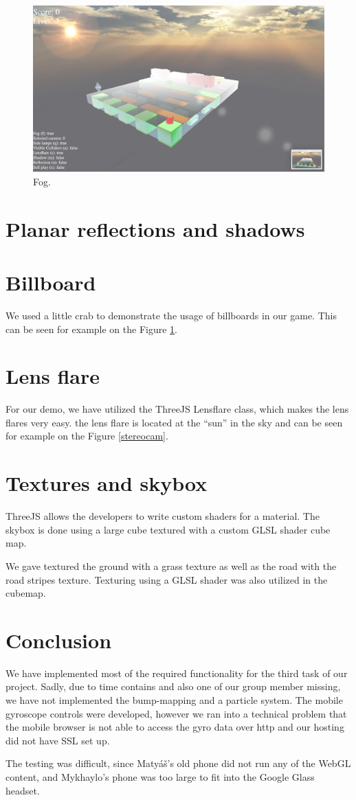 \documentclass[a4paper,10pt]{article}
\begin{document}
\begin{figure}[!htb]
	\centering
 	\includegraphics[width=0.5\linewidth]{images/fog.png}
  	\caption{Fog.}
	\label{fog}
\end{figure}


\section{Planar reflections and shadows}

\section{Billboard}
We used a little crab to demonstrate the usage of billboards in our game. This can be seen for example on the Figure \ref{fog}.

\section{Lens flare}
For our demo, we have utilized the ThreeJS Lensflare class, which makes the lens flares very easy. the lens flare is located at the ``sun'' in the sky and can be seen for example on the Figure \ref{stereocam}.

\section{Textures and skybox}
ThreeJS allows the developers to write custom shaders for a material. The skybox is done using a large cube textured with a custom GLSL shader cube map. 

We gave textured the ground with a grass texture as well as the road with the road stripes texture. Texturing using a GLSL shader was also utilized in the cubemap.

\section*{Conclusion}
We have implemented most of the required functionality for the third task of our project. Sadly, due to time contains and also one of our group member missing, we have not implemented the bump-mapping and a particle system. The mobile gyroscope controls were developed, however we ran into a technical problem that the mobile browser is not able to access the gyro data over http and our hosting did not have SSL set up. 

The testing was difficult, since Matyáš's old phone did not run any of the WebGL content, and Mykhaylo's phone was too large to fit into the Google Glass headset. 
\end{document}
